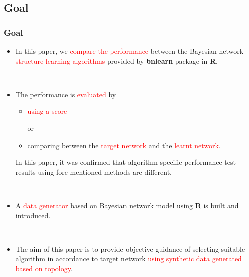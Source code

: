 \documentclass{beamer}
\begin{document}
\subsection{Goal}
\begin{frame}
\frametitle{Goal}
{\scriptsize{}
\begin{itemize}
	\item In this paper, we \textcolor{red}{compare the performance} between the Bayesian network \textcolor{red}{structure learning algorithms} provided by \textbf{bnlearn} package in \textbf{R}.

	{}\
	
	\item The performance is \textcolor{red}{evaluated} by

	\begin{itemize}
		\item \textcolor{red}{using a score}
		
		 or
		 
		\item comparing between the \textcolor{red}{target network} and the \textcolor{red}{learnt network}.
	\end{itemize}	
	
		In this paper, it was confirmed that algorithm specific performance test results using fore-mentioned methods are different.

	{}\

	\item A \textcolor{red}{data generator} based on Bayesian network model using \textbf{R} is built and introduced.

	{}\

	\item The aim of this paper is to provide objective guidance of selecting suitable algorithm in accordance to target network \textcolor{red}{using synthetic data generated based on topology}.
\end{itemize}
}
\end{frame}
\end{document}
